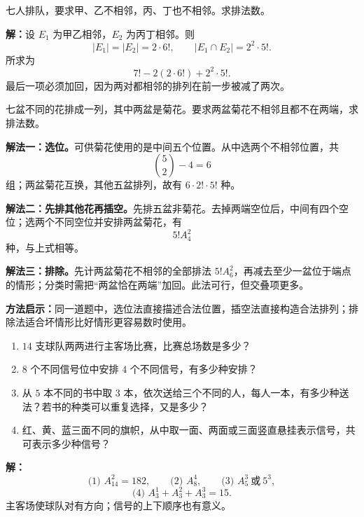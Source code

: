 \begin{examplebox}
  七人排队，要求甲、乙不相邻，丙、丁也不相邻。求排法数。

  \textbf{解：}设 $E_1$ 为甲乙相邻，$E_2$ 为丙丁相邻。则
  \[
    |E_1|=|E_2|=2\cdot6!,
    \qquad |E_1\cap E_2|=2^2\cdot5!.
  \]
  所求为
  \[
    7!-2(2\cdot6!)+2^2\cdot5!.
  \]
  最后一项必须加回，因为两对都相邻的排列在前一步被减了两次。
\end{examplebox}

\begin{examplebox}
  七盆不同的花排成一列，其中两盆是菊花。要求两盆菊花不相邻且都不在两端，求排法数。

  \textbf{解法一：选位。}可供菊花使用的是中间五个位置。从中选两个不相邻位置，共
  \[
    \binom52-4=6
  \]
  组；两盆菊花互换，其他五盆排列，故有 $6\cdot2!\cdot5!$ 种。

  \textbf{解法二：先排其他花再插空。}先排五盆非菊花。去掉两端空位后，中间有四个空位；选两个不同空位并安排两盆菊花，有
  \[
    5!A_4^2
  \]
  种，与上式相等。

  \textbf{解法三：排除。}先计两盆菊花不相邻的全部排法 $5!A_6^2$，再减去至少一盆位于端点的情形；分类时需把“两盆恰在两端”加回。此法可行，但交叠项更多。

  \textbf{方法启示：}同一道题中，选位法直接描述合法位置，插空法直接构造合法排列；排除法适合坏情形比好情形更容易数时使用。
\end{examplebox}

\begin{examplebox}
  \begin{enumerate}
    \item $14$ 支球队两两进行主客场比赛，比赛总场数是多少？
    \item $8$ 个不同信号位中安排 $4$ 个不同信号，有多少种安排？
    \item 从 $5$ 本不同的书中取 $3$ 本，依次送给三个不同的人，每人一本，有多少种送法？若书的种类可以重复选择，又是多少？
    \item 红、黄、蓝三面不同的旗帜，从中取一面、两面或三面竖直悬挂表示信号，共可表示多少种信号？
  \end{enumerate}

  \textbf{解：}
  \[
    \text{(1) }A_{14}^2=182,\qquad
    \text{(2) }A_8^4,\qquad
    \text{(3) }A_5^3\ \text{或}\ 5^3,
  \]
  \[
    \text{(4) }A_3^1+A_3^2+A_3^3=15.
  \]
  主客场使球队对有方向；信号的上下顺序也有意义。
\end{examplebox}

